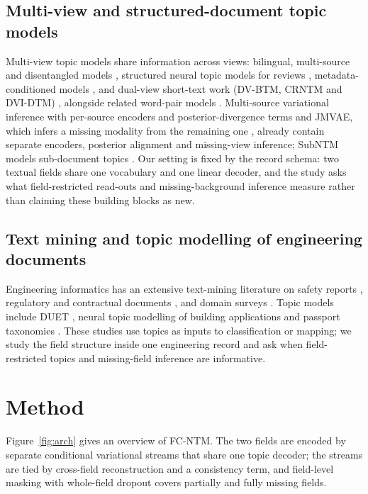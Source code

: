 \documentclass[11pt]{article}
\newcommand{\fcntm}{FC-NTM}
\begin{document}
\subsection{Multi-view and structured-document topic models}

Multi-view topic models share information across views: bilingual, multi-source and disentangled
models \cite{kurle2019multisource,zhang2017robust,pergola2021disentangled,liu2022dualview},
structured neural topic models for reviews \cite{esmaeili2019structured}, metadata-conditioned
models \cite{card2018metadata,roberts2019stm}, and dual-view short-text work (DV-BTM, CRNTM and
DVI-DTM) \cite{liu2022dualview,crntm2020,dvidtm2026}, alongside related word-pair models
\cite{relationalbtm2018,sparsebtm2021}. Multi-source variational inference with per-source encoders
and posterior-divergence terms \cite{kurle2019multisource} and JMVAE, which infers a missing
modality from the remaining one \cite{suzuki2017jmvae}, already contain separate encoders,
posterior alignment and missing-view inference; SubNTM models sub-document topics
\cite{nguyen2026subntm}. Our setting is fixed by the record schema: two textual fields share one
vocabulary and one linear decoder, and the study asks what field-restricted read-outs and
missing-background inference measure rather than claiming these building blocks as new.

\subsection{Text mining and topic modelling of engineering documents}

Engineering informatics has an extensive text-mining literature on safety reports
\cite{civilsafety2015,civilaccident2018}, regulatory and contractual documents
\cite{compliance2013,ontology2015,contract2022,risknlp2023}, and domain surveys
\cite{civilnlp2021,civilnlp2023}. Topic models include DUET \cite{duet2019}, neural topic modelling
of building applications \cite{civiltopic2024} and passport taxonomies \cite{passport2026}. These
studies use topics as inputs to classification or mapping; we study the field structure inside one
engineering record and ask when field-restricted topics and missing-field inference are
informative.

\section{Method}

Figure~\ref{fig:arch} gives an overview of \fcntm{}. The two fields are encoded by separate
conditional variational streams that share one topic decoder; the streams are tied by cross-field
reconstruction and a consistency term, and field-level masking with whole-field dropout covers
partially and fully missing fields.
\end{document}
